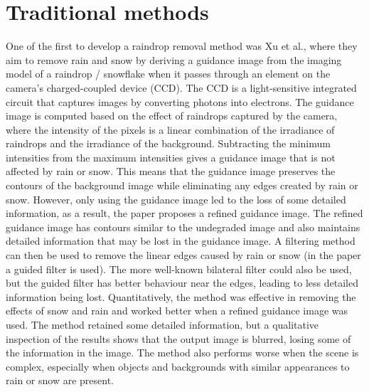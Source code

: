 \documentclass[11pt]{ociamthesis}  %
\begin{document}
\section{Traditional methods}
One of the first to develop a raindrop removal method was Xu et al.\cite{xu2012improved}, where they aim to remove rain and snow by deriving a guidance image from the imaging model of a raindrop / snowflake when it passes through an element on the camera's charged-coupled device (CCD). The CCD is a light-sensitive integrated circuit that captures images by converting photons into electrons. The guidance image is computed based on the effect of raindrops captured by the camera, where the intensity of the pixels is a linear combination of the irradiance of raindrops and the irradiance of the background. Subtracting the minimum intensities from the maximum intensities gives a guidance image that is not affected by rain or snow. This means that the guidance image preserves the contours of the background image while eliminating any edges created by rain or snow. However, only using the guidance image led to the loss of some detailed information, as a result, the paper proposes a refined guidance image. The refined guidance image has contours similar to the undegraded image and also maintains detailed information that may be lost in the guidance image. A filtering method can then be used to remove the linear edges caused by rain or snow (in the paper a guided filter\cite{6319316} is used). The more well-known bilateral filter could also be used, but the guided filter has better behaviour near the edges, leading to less detailed information being lost. Quantitatively, the method was effective in removing the effects of snow and rain and worked better when a refined guidance image was used. The method retained some detailed information, but a qualitative inspection of the results shows that the output image is blurred, losing some of the information in the image. The method also performs worse when the scene is complex, especially when objects and backgrounds with similar appearances to rain or snow are present. 
\end{document}
